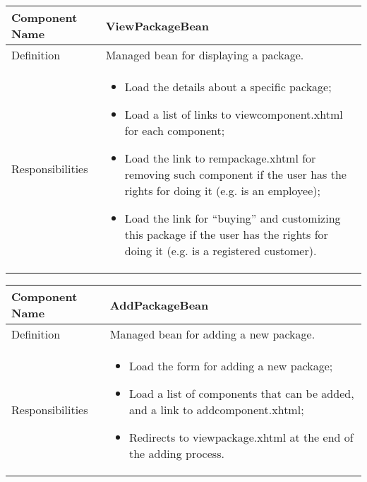 \documentclass[a4paper,12pt]{book}
\begin{document}
        \begin{center}
          \begin{tabular}{ | p{3.3cm} | p{11.7cm} | }
            \hline
            Component Name & \textbf{ViewPackageBean} \\ \hline
            Definition & Managed bean for displaying a package. \\ \hline
            Responsibilities & \parbox{0.65\textwidth}{
              \begin{itemize}[noitemsep,leftmargin=*]
                \item Load the details about a specific package;
                \item Load a list of links to viewcomponent.xhtml for each component;
                \item Load the link to rempackage.xhtml for removing such component if the user has the rights for doing it (e.g. is an employee);
                \item Load the link for ``buying'' and customizing this package if the user has the rights for doing it (e.g. is a registered customer).
              \end{itemize}} \\ \hline
            \end{tabular}
          \end{center}
          \begin{center}
            \begin{tabular}{ | p{3.3cm} | p{11.7cm} | }
              \hline
              Component Name & \textbf{AddPackageBean} \\ \hline
              Definition & Managed bean for adding a new package. \\ \hline
              Responsibilities & \parbox{0.65\textwidth}{
                \begin{itemize}[noitemsep,leftmargin=*]
                  \item Load the form for adding a new package;
                  \item Load a list of components that can be added, and a link to addcomponent.xhtml;
                  \item Redirects to viewpackage.xhtml at the end of the adding process.
                \end{itemize}} \\ \hline
              \end{tabular}
            \end{center}
\end{document}
